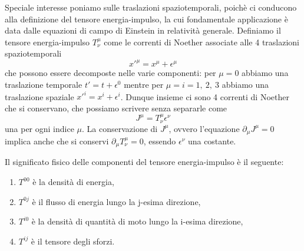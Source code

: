     Speciale interesse poniamo sulle traslazioni spaziotemporali, poichè ci conducono alla definizione del tensore energia-impulso, la cui fondamentale applicazione è data dalle equazioni di campo di Einstein in relatività generale. 
    Definiamo il tensore energia-impulso $T^\mu_\nu$ come le correnti di Noether associate alle 4 traslazioni spaziotemporali
    \begin{equation*}
        x'^\mu = x^\mu + \epsilon^\mu
    \end{equation*}
    che possono essere decomposte nelle varie componenti: per $\mu=0$ abbiamo una traslazione temporale $t' = t + \epsilon^0$ mentre per $\mu=i=1,~2,~3$ abbiamo una traslazione spaziale $x'^i = x^i + \epsilon^i$. Dunque insieme ci sono 4 correnti di Noether che si conservano, che possiamo scrivere senza separarle come 
    \begin{equation} \label{tensenimp}
        J^\mu = T^\mu_\nu \epsilon^\nu
    \end{equation}
    una per ogni indice $\mu$. La conservazione di $J^\mu$, ovvero l'equazione $\partial_\mu J^\mu = 0 $ implica anche che si conservi $\partial_\mu T^\mu_\nu = 0$, essendo $\epsilon^\nu$ una costante.

    Il significato fisico delle componenti del tensore energia-impulso è il seguente: 
    \begin{enumerate}
        \item $T^{00}$ è la densità di energia,
        \item $T^{0j}$ è il flusso di energia lungo la j-esima direzione,
        \item $T^{i0}$ è la densità di quantità di moto lungo la i-esima direzione,
        \item $T^{ij}$ è il tensore degli sforzi.
    \end{enumerate}

